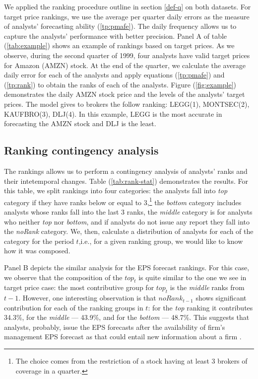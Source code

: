 \documentclass{article}\usepackage[]{graphicx}\usepackage[]{color}
\begin{document}
We applied the ranking procedure outline in section \ref{def-q} on both datasets. For target price rankings, we use the average per quarter daily errors as the measure of analysts' forecasting ability (\ref{tp:pmafe}). The daily frequency allows us to capture the analysts' performance with better precision. Panel A of table (\ref{tab:example}) shows an example of rankings based on target prices. As we observe, during the second quarter of 1999, four analysts have valid target prices for Amazon (AMZN) stock. At the end of the quarter, we calculate the average daily error for each of the analysts and apply equations (\ref{tp:pmafe}) and (\ref{tp:rank}) to obtain the ranks of each of the analysts. Figure (\ref{fig:example}) demonstrates the daily AMZN stock price and the levels of the analysts' target prices. The model gives to brokers the follow ranking: LEGG(1), MONTSEC(2), KAUFBRO(3), DLJ(4). In this example, LEGG is the most accurate in forecasting the AMZN stock and DLJ is the least.
\subsection{Ranking contingency analysis}
The rankings allows us to perform a contingency analysis of analysts' ranks and their intetemporal changes. Table (\ref{tab:rank-stat}) demonstrates the results. For this table, we split rankings into four categories: the analysts fall into \emph{top} category if they have ranks below or equal to 3,\footnote{The choice comes from the restriction of a stock having at least 3 brokers of coverage in a quarter.} the \emph{bottom} category includes analysts whose ranks fall into the last 3 ranks, the \emph{middle} category is for analysts who neither \emph{top} nor \emph{bottom}, and if analysts do not issue any report they fall into the \emph{noRank} category.  We, then, calculate a distribution of analysts for each of the category for the period $t$,i.e., for a given ranking group, we would like to know how it was composed.




Panel B depicts the similar analysis for the EPS forecast rankings. For this case, we observe that the composition of the $top_{t}$ is quite similar to the  one we see in target price case: the most contributive group for $top_{t}$ is the \emph{middle} ranks from $t-1$. However, one interesting observation is that $noRank_{t-1}$ shows significant contribution for each of the ranking groups in $t$: for the \emph{top} ranking it contributes 34.3\%, for the \emph{middle} --- 43.9\%, and for the \emph{bottom} --- 48.7\%. This suggests that analysts, probably, issue the EPS forecasts after the availability of firm's management EPS forecast as that could entail new information about a firm \citep{hassel1986}.
\end{document}
